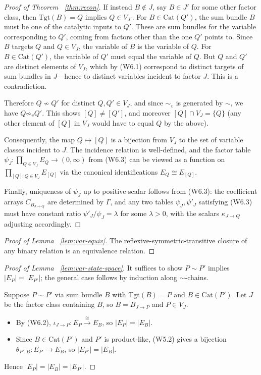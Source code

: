 \documentclass{article}
\theoremstyle{plain}
\theoremstyle{definition}
\theoremstyle{remark}
\newcommand{\Cat}{\textrm{Cat}}
\newcommand{\<}{\langle}
\newcommand{\tgt}{\textrm{Tgt}}
\renewcommand{\>}{\rangle}
\begin{document}
\begin{proof}[Proof of Theorem ~\ref{thm:recon}]
If instead $B \notin J$, say $B \in J'$ for some other factor class, then 
$\tgt(B) = Q$ implies $Q \in V_{J'}$. For $B \in \Cat(Q')$, the sum bundle 
$B$ must be one of the catalytic inputs to $Q'$. These are sum bundles for 
the variable corresponding to $Q'$, coming from factors other than the one 
$Q'$ points to. Since $B$ targets $Q$ and $Q \in V_J$, the variable of $B$ 
is the variable of $Q$. For $B \in \Cat(Q')$, the variable of $Q'$ must equal 
the variable of $Q$. But $Q$ and $Q'$ are distinct elements of $V_J$, which 
by (W6.1) correspond to distinct targets of sum bundles in $J$---hence to 
distinct variables incident to factor $J$. This is a contradiction.

Therefore $Q \not\sim Q'$ for distinct $Q, Q' \in V_J$, and since $\sim_v$ is 
generated by $\sim$, we have $Q \not\sim_v Q'$. This shows $[Q] \neq [Q']$, 
and moreover $[Q] \cap V_J = \{Q\}$ (any other element of $[Q]$ in $V_J$ 
would have to equal $Q$ by the above).

Consequently, the map $Q \mapsto [Q]$ is a bijection from $V_J$ to the set of 
variable classes incident to $J$. The incidence relation is well-defined, and 
the factor table $\psi_J : \prod_{Q \in V_J} E_Q \to (0,\infty)$ from (W6.3) 
can be viewed as a function on $\prod_{[Q] : Q \in V_J} E_{[Q]}$ via the 
canonical identifications $E_Q \cong E_{[Q]}$.

Finally, uniqueness of $\psi_J$ up to positive scalar follows from (W6.3): 
the coefficient arrays $C_{B_{J \to Q}}$ are determined by $\Gamma$, and any 
two tables $\psi_J, \psi'_J$ satisfying (W6.3) must have constant ratio 
$\psi'_J / \psi_J = \lambda$ for some $\lambda > 0$, with the scalars 
$\kappa_{J \to Q}$ adjusting accordingly.
\end{proof}

\begin{proof}[Proof of Lemma ~\ref{lem:var-equiv}]
The reflexive-symmetric-transitive closure of any binary relation is an 
equivalence relation.
\end{proof}
\begin{proof}[Proof of Lemma ~\ref{lem:var-state-space}]
It suffices to show $P \sim P'$ implies $|E_P| = |E_{P'}|$; the general case 
follows by induction along $\sim$-chains.

Suppose $P \sim P'$ via sum bundle $B$ with $\tgt(B) = P$ and $B \in \Cat(P')$.
Let $J$ be the factor class containing $B$, so $B = B_{J \to P}$ and $P \in V_J$.
\begin{itemize}
    \item By (W6.2), $\iota_{J \to P} : E_P \xrightarrow{\cong} E_B$, so $|E_P| = |E_B|$.
    \item Since $B \in \Cat(P')$ and $P'$ is product-like, (W5.2) gives a bijection 
          $\theta_{P',B} : E_{P'} \to E_B$, so $|E_{P'}| = |E_B|$.
\end{itemize}
Hence $|E_P| = |E_B| = |E_{P'}|$.
\end{proof}
\end{document}
